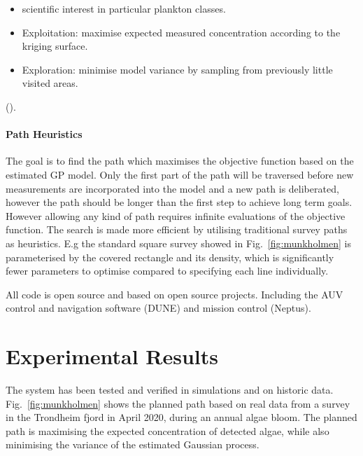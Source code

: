 \documentclass[conference]{IEEEtran}
\newcommand{\cmt}[1]{{\color{red}{#1}}}
\begin{document}
\begin{itemize}

    \item scientific interest in particular plankton classes. 
    \item Exploitation: maximise expected measured concentration
      according to the kriging surface. 
    \item Exploration: minimise model variance by sampling from
      previously little visited areas. 

\end{itemize}

(\cmt{This is very abrupt. You want to say where the GP is being used,
  but after you talk about the plan-exec, since it is the plan-exec
  component which determines when to activate the GP and modify the
  kernel. There should be a nice flow between when you introduce the
  GP with the rest of the para's below. And after Plan/Exec.}).

\paragraph{Path Heuristics}

The goal is to find the path which maximises the objective function
based on the estimated GP model.  Only the first part of the path will
be traversed before new measurements are incorporated into the model
and a new path is deliberated, however the path should be longer than
the first step to achieve long term goals.  However allowing any kind
of path requires infinite evaluations of the objective function.  The
search is made more efficient by utilising traditional survey paths as
heuristics. E.g the standard square survey showed in
Fig.~\ref{fig:munkholmen} is parameterised by the covered rectangle
and its density, which is significantly fewer parameters to optimise
compared to specifying each line individually.

All code is open source and based on open source projects. Including
the AUV control and navigation software (DUNE) and mission control
(Neptus)\cite{pinto2013lsts}.

\section{Experimental Results}

The system has been tested and verified in simulations and on historic
data. Fig.~\ref{fig:munkholmen} shows the planned path based on real
data from a survey in the Trondheim fjord in April 2020, during an
annual algae bloom. The planned path is maximising the expected
concentration of detected algae, while also minimising the variance of
the estimated Gaussian process.
\end{document}
